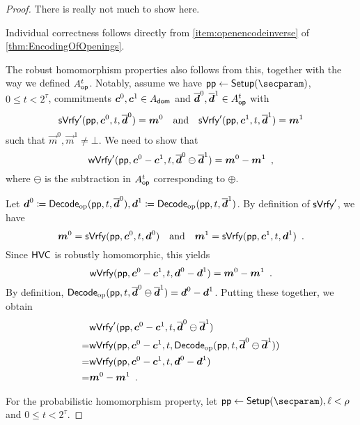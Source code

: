\begin{proof}
There is really not much to show here.

Individual correctness follows directly from \autoref{item:openencodeinverse} of \autoref{thm:EncodingOfOpenings}.

The robust homomorphism properties also follows from this, together with the way we defined $A_{\mathsf{op}}^{t}$.
Notably, assume we have $\params\gets\setup(\secparam)$, $0\leq t < 2^\tau$, commitments $\boldsymbol{c}^0,\boldsymbol{c}^1\in A_{\mathsf{dom}}$ and $\overline{\boldsymbol{d}}^0,\overline{\boldsymbol{d}}^1\in A_{\mathsf{op}}^{t}$ with
\[
 \mathsf{sVrfy}'(\mathsf{pp},\boldsymbol{c}^0,t,\overline{\boldsymbol{d}}^0) = \boldsymbol{m}^0
 \quad\text{and}\quad
 \mathsf{sVrfy}'(\mathsf{pp},\boldsymbol{c}^1,t,\overline{\boldsymbol{d}}^1) = \boldsymbol{m}^1
\]
such that $\vec{m}^0,\vec{m}^1\neq \bot$.
We need to show that
\[
 \mathsf{wVrfy}'(\mathsf{pp}, \boldsymbol{c}^0-\boldsymbol{c}^1, t, \overline{\boldsymbol{d}}^0 \ominus \overline{\boldsymbol{d}}^1) = \boldsymbol{m}^0 - \boldsymbol{m}^1\enspace,
\]
where $\ominus$ is the subtraction in $A_{\mathsf{op}}^{t}$ corresponding to $\oplus$.

Let $\boldsymbol{d}^0 \coloneqq \mathsf{Decode}_{\mathrm{op}}(\mathsf{pp}, t, \overline{\boldsymbol{d}}^0), \boldsymbol{d}^1\coloneqq \mathsf{Decode}_{\mathrm{op}}(\mathsf{pp}, t, \overline{\boldsymbol{d}}^1)$. By definition of $\mathsf{sVrfy}'$, we have
\[
 \boldsymbol{m}^0 = \mathsf{sVrfy}(\mathsf{pp},\boldsymbol{c}^0,t,\boldsymbol{d}^0)
 \quad\text{and}\quad
 \boldsymbol{m}^1 = \mathsf{sVrfy}(\mathsf{pp},\boldsymbol{c}^1,t,\boldsymbol{d}^1)\enspace.
\]
Since $\mathsf{HVC}$ is robustly homomorphic, this yields
\[
 \mathsf{wVrfy}(\mathsf{pp}, \boldsymbol{c}^0-\boldsymbol{c}^1, t, \boldsymbol{d}^0 - \boldsymbol{d}^1) = \boldsymbol{m}^0 - \boldsymbol{m}^1\enspace.
\]
By definition, $\mathsf{Decode}_{\mathrm{op}}(\mathsf{pp}, t, \overline{\boldsymbol{d}}^0 \ominus \overline{\boldsymbol{d}}^1) = \boldsymbol{d}^0 - \boldsymbol{d}^1$. Putting these together, we obtain
\begin{align*}
   &\mathsf{wVrfy}'(\mathsf{pp}, \boldsymbol{c}^0-\boldsymbol{c}^1, t, \overline{\boldsymbol{d}}^0 \ominus \overline{\boldsymbol{d}}^1) \\
 = &\mathsf{wVrfy} (\mathsf{pp}, \boldsymbol{c}^0 - \boldsymbol{c}^1, t, \mathsf{Decode}_{\mathrm{op}}(\mathsf{pp}, t, \overline{\boldsymbol{d}}^0 \ominus \overline{\boldsymbol{d}}^1) )\\
 = &\mathsf{wVrfy} (\mathsf{pp}, \boldsymbol{c}^0 - \boldsymbol{c}^1, t, \boldsymbol{d}^0 - \boldsymbol{d}^1)\\
 = &\boldsymbol{m}^0 - \boldsymbol{m}^1\enspace.
\end{align*}

For the probabilistic homomorphism property, let $\params\gets\setup(\secparam), \ell < \rho$ and $0\leq t < 2^\tau$.


\end{proof}
